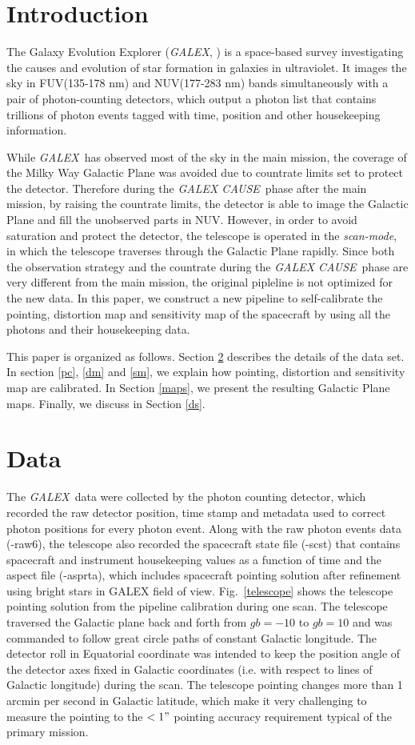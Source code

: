 \documentclass[12pt, preprint]{aastex}
\newcommand{\project}[1]{\textsl{#1}}
\newcommand{\galex}{\project{GALEX}}
\newcommand{\cause}{\project{GALEX CAUSE}}
\newcommand{\scanmode}{\project{scan-mode}}
\begin{document}
\section{Introduction}
The Galaxy Evolution Explorer (\galex, \citealt{galex1}) is a space-based survey investigating the causes and evolution of star formation in galaxies in ultraviolet. 
It images the sky in FUV(135-178 nm) and NUV(177-283 nm) bands simultaneously with a pair of photon-counting detectors, which output a photon list that contains trillions of photon events tagged with time, position and other housekeeping information.

While \galex\ has observed most of the sky in the main mission, the coverage of the Milky Way Galactic Plane was avoided due to countrate limits set to protect the detector.
Therefore during the \cause\ phase after the main mission, by raising the countrate limits, the detector is able to image the Galactic Plane and fill the unobserved parts in NUV.
However, in order to avoid saturation and protect the detector, the telescope is operated in the \scanmode, in which the telescope traverses through the Galactic Plane rapidly.
Since both the observation strategy and the countrate during the \cause\ phase are very different from the main mission, the original pipleline is not optimized for the new data.
In this paper, we construct a new pipeline to self-calibrate the pointing, distortion map and sensitivity map of the spacecraft by using all the photons and their housekeeping data.

This paper is organized as follows. 
Section \ref{data} describes the details of the data set.
In section \ref{pc}, \ref{dm} and \ref{sm}, we explain how pointing, distortion and sensitivity map are calibrated.
In Section \ref{maps}, we present the resulting Galactic Plane maps.
Finally, we discuss in Section \ref{ds}.

\section{Data}
\label{data}
The \galex\ data were collected by the photon counting detector, which recorded the raw detector position, time stamp and metadata used to correct photon positions for every photon event.
Along with the raw photon events data (-raw6), the telescope also recorded the spacecraft state file (-scst) that contains spacecraft and instrument housekeeping values as a function of time and the aspect file (-asprta), which includes spacecraft pointing solution after refinement using bright stars in GALEX field of view.
Fig.~\ref{telescope} shows the telescope pointing solution from the pipeline calibration during one scan.
The telescope traversed the Galactic plane back and forth from $gb=-10$ to $gb=10$ and was commanded to follow great circle paths of constant Galactic longitude.
The detector roll in Equatorial coordinate was intended to keep the position angle of the detector axes fixed in Galactic coordinates (i.e. with respect to lines of Galactic longitude) during the scan.
The telescope pointing changes more than 1 arcmin per second in Galactic latitude, which make it very challenging to measure the pointing to the $<1"$ pointing accuracy requirement typical of the primary mission.
\end{document}
